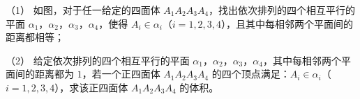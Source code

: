 \begin{question}
（1） 如图，对于任一给定的四面体 $A_1A_2A_3A_4$，找出依次排列的四个相互平行的平面 $\alpha_1$，$\alpha_2$，$\alpha_3$，$\alpha_4$，使得 $A_i\in\alpha_i$（$i=1,2,3,4$），且其中每相邻两个平面间的距离都相等；

（2） 给定依次排列的四个相互平行的平面 $\alpha_1$，$\alpha_2$，$\alpha_3$，$\alpha_4$，其中每相邻两个平面间的距离都为 $1$，若一个正四面体 $A_1A_2A_3A_4$ 的四个顶点满足：$A_i\in\alpha_i$（$i=1,2,3,4$），求该正四面体 $A_1A_2A_3A_4$ 的体积。
\nopagebreak[4]
\begin{center}\end{center}
\nopagebreak[4]

\end{question}